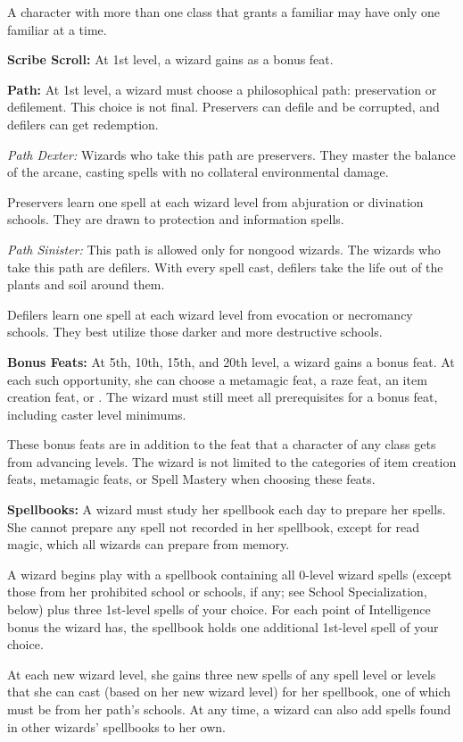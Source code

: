 A character with more than one class that grants a familiar may have only one familiar at a time.

\textbf{Scribe Scroll:} At 1st level, a wizard gains  as a bonus feat.

\textbf{Path:} At 1st level, a wizard must choose a philosophical path: preservation or defilement. This choice is not final. Preservers can defile and be corrupted, and defilers can get redemption.

\textit{Path Dexter:} Wizards who take this path are preservers. They master the balance of the arcane, casting spells with no collateral environmental damage.

Preservers learn one spell at each wizard level from abjuration or divination schools. They are drawn to protection and information spells.

\textit{Path Sinister:} This path is allowed only for nongood wizards. The wizards who take this path are defilers. With every spell cast, defilers take the life out of the plants and soil around them.

Defilers learn one spell at each wizard level from evocation or necromancy schools. They best utilize those darker and more destructive schools.

\textbf{Bonus Feats:} At 5th, 10th, 15th, and 20th level, a wizard gains a bonus feat. At each such opportunity, she can choose a metamagic feat, a raze feat, an item creation feat, or . The wizard must still meet all prerequisites for a bonus feat, including caster level minimums.

These bonus feats are in addition to the feat that a character of any class gets from advancing levels. The wizard is not limited to the categories of item creation feats, metamagic feats, or Spell Mastery when choosing these feats.

\textbf{Spellbooks:} A wizard must study her spellbook each day to prepare her spells. She cannot prepare any spell not recorded in her spellbook, except for read magic, which all wizards can prepare from memory.

A wizard begins play with a spellbook containing all 0-level wizard spells (except those from her prohibited school or schools, if any; see School Specialization, below) plus three 1st-level spells of your choice. For each point of Intelligence bonus the wizard has, the spellbook holds one additional 1st-level spell of your choice.

At each new wizard level, she gains three new spells of any spell level or levels that she can cast (based on her new wizard level) for her spellbook, one of which must be from her path's schools. At any time, a wizard can also add spells found in other wizards' spellbooks to her own.

